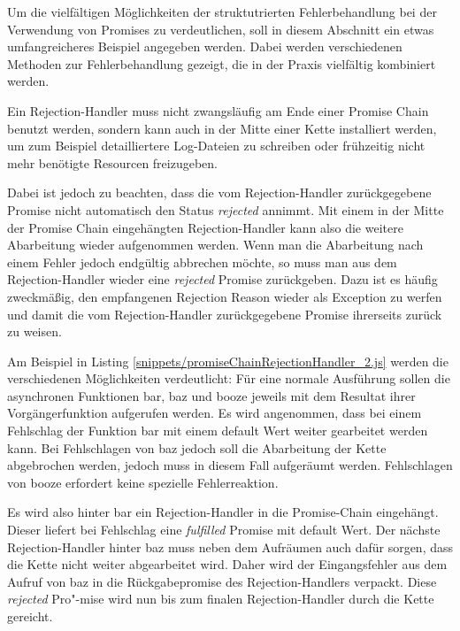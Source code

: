\documentclass[
11pt, %
a4paper, %
oneside, %
pdfspacing, %
headinclude,
BCOR5mm, %
ngerman, %
bibtotocnumbered,
]{scrartcl}
\begin{document}
		Um die vielfältigen Möglichkeiten der struktutrierten Fehlerbehandlung bei der Verwendung von Promises zu verdeutlichen, soll in diesem Abschnitt ein etwas umfangreicheres Beispiel angegeben werden. Dabei werden verschiedenen Methoden zur Fehlerbehandlung gezeigt, die in der Praxis vielfältig kombiniert werden.
	
		Ein Rejection-Handler muss nicht zwangsläufig am Ende einer Pro\-mise Chain benutzt werden, sondern kann auch in der Mitte einer Kette installiert werden, um zum Beispiel detailliertere Log-Dateien zu schreiben oder frühzeitig nicht mehr benötigte Resourcen freizugeben. 
		
		Dabei ist jedoch zu beachten, dass die vom Rejection-Handler zurückgegebene Promise nicht automatisch den Status \emph{rejected} annimmt. 
		Mit einem in der Mitte der Promise Chain eingehängten Rejection-Handler kann also die weitere Abarbeitung wieder aufgenommen werden. Wenn man die Abarbeitung nach einem Fehler jedoch endgültig abbrechen möchte, so muss man aus dem Rejection-Handler wieder eine \emph{rejected} Promise zurückgeben. Dazu ist es häufig zweckmäßig, den empfangenen Rejection Reason wieder als Exception zu werfen und damit die vom Rejection-Handler zurückgegebene Promise ihrerseits zurück zu weisen.
		
		
		Am Beispiel in Listing \ref{snippets/promiseChainRejectionHandler_2.js} werden die verschiedenen Möglichkeiten verdeutlicht:
		Für eine normale Ausführung sollen die asynchronen Funktionen \textsf{bar}, \textsf{baz} und \textsf{booze} jeweils mit dem Resultat ihrer Vorgängerfunktion aufgerufen werden. Es wird angenommen, dass bei einem Fehlschlag der Funktion \textsf{bar} mit einem default Wert weiter gearbeitet werden kann. Bei Fehlschlagen von \textsf{baz} jedoch soll die Abarbeitung der Kette abgebrochen werden, jedoch muss in diesem Fall aufgeräumt werden. Fehlschlagen von \textsf{booze} erfordert keine spezielle Fehlerreaktion.
		
		Es wird also hinter \textsf{bar} ein Rejection-Handler in die Promise-Chain eingehängt. Dieser liefert bei Fehlschlag eine \emph{fulfilled} Promise mit default Wert. Der nächste Rejection-Handler hinter \textsf{baz} muss neben dem Aufräumen auch dafür sorgen, dass die Kette nicht weiter abgearbeitet wird. Daher wird der Eingangsfehler aus dem Aufruf von \textsf{baz} in die Rückgabepromise des Rejection-Handlers verpackt. Diese \emph{rejected} Pro"-mise wird nun bis zum finalen Rejection-Handler durch die Kette gereicht.
		
\end{document}
